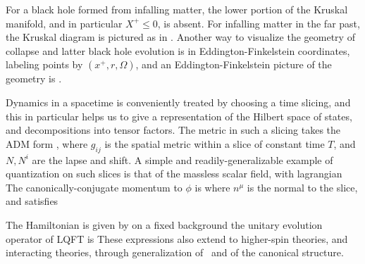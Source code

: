

For a black hole formed from infalling matter, the lower portion of the Kruskal manifold, and  in particular $X^+\leq0$, is absent.  For infalling matter in the far past, the Kruskal diagram is pictured as in \Kdiag.  Another way to visualize the geometry of collapse and latter black hole evolution is in Eddington-Finkelstein coordinates, labeling points by $(x^+, r, \Omega)$, and an Eddington-Finkelstein picture of the geometry is \EddFink.  



Dynamics in a spacetime is conveniently treated by choosing a time slicing, and this in particular helps us to give a representation of the Hilbert space of states, and decompositions into tensor factors.   The metric in such a slicing takes the ADM form ,
%
\eqn{}
%
where $g_{ij}$ is the spatial metric within a slice of constant time $T$, and $N,N^i$ are the lapse and shift.  A simple and readily-generalizable example of quantization on such slices is that of the massless scalar field, with lagrangian
%
\eqn{}
%
The canonically-conjugate momentum to $\phi$ is 
%
\eqn{}
%
where $n^\mu$ is the normal to the slice,
and satisfies
%
\eqn{}
%


The Hamiltonian is given by
%
\eqn{}
%
on a fixed background the unitary evolution operator of LQFT is
%
\eqn{}
%
These expressions also extend to higher-spin theories, and interacting theories, through generalization of \hgen\ and of  the canonical structure.

